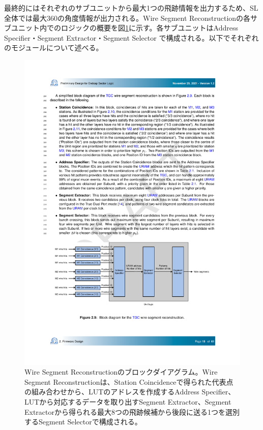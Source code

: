 最終的にはそれぞれのサブユニットから最大1つの飛跡情報を出力するため、SL全体では最大360の角度情報が出力される。Wire Segment Reconstructionの各サブユニット内でのロジックの概要を図\ref{SegReco_wire}に示す。各サブユニットはAddress Specifier・Segment Extractor・Segment Selector で構成される。以下でそれぞれのモジュールについて述べる。

\begin{figure} 
\centering
\includegraphics[width=16cm]{fig/SL/SegReco_wire.pdf}
\caption[Wire Segment Reconstructionのブロックダイアグラム]{Wire Segment Reconstructionのブロックダイアグラム\cite{SLPDR}。Wire Segment Reconstructionは、Station Coincidenceで得られた代表点の組み合わせから、LUTのアドレスを作成するAddress Specifier、LUTから対応するデータを取り出すSegment Extractor、Segment Extractorから得られる最大8つの飛跡候補から後段に送る1つを選別するSegment Selectorで構成される。}
\label{SegReco_wire}
\end{figure}

